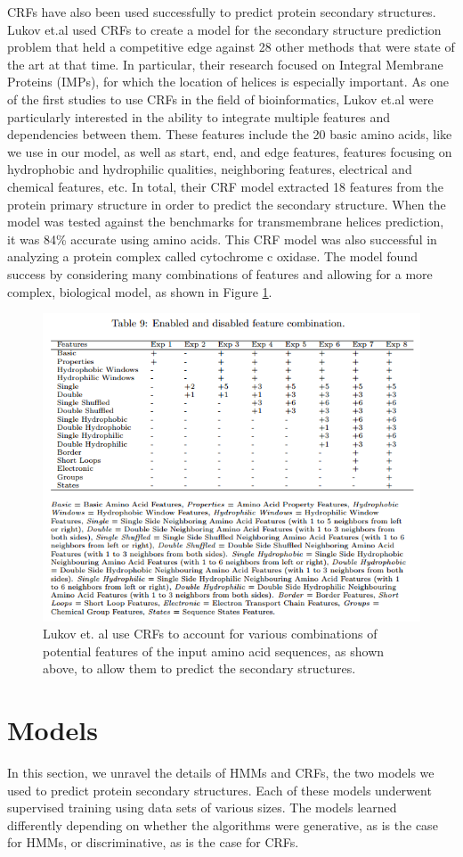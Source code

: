 \documentclass[11 pt, twocolumn]{article}
\begin{document}
CRFs have also been used successfully to predict protein secondary structures. Lukov et.al\cite{Lukov} used CRFs to create a model for the secondary structure prediction problem that held a competitive edge against 28 other methods that were state of the art at that time. In particular, their research focused on Integral Membrane Proteins (IMPs), for which the location of helices is especially important. As one of the first studies to use CRFs in the field of bioinformatics, Lukov et.al were particularly interested in the ability to integrate multiple features and dependencies between them. These features include the 20 basic amino acids, like we use in our model, as well as start, end, and edge features, features focusing on hydrophobic and hydrophilic qualities, neighboring features, electrical and chemical features, etc. In total, their CRF model extracted 18 features from the protein primary structure in order to predict the secondary structure. When the model was tested against the benchmarks for transmembrane helices prediction, it was 84\% accurate using amino acids. This CRF model was also successful in analyzing a protein complex called cytochrome c oxidase. The model found success by considering many combinations of features and allowing for a more complex, biological model, as shown in Figure \ref{fig:compCRFMod}.

\begin{figure}
\includegraphics[width = .5\textwidth]{ComplexCRFMod.png}
\caption{Lukov et. al \cite{Lukov} use CRFs to account for various combinations of potential features of the input amino acid sequences, as shown above, to allow them to predict the secondary structures.}
\label{fig:compCRFMod}
\end{figure}

\section{Models}

In this section, we unravel the details of HMMs and CRFs, the two models we used to predict protein secondary structures. Each of these models underwent supervised training using data sets of various sizes. The models learned differently depending on whether the algorithms were generative, as is the case for HMMs, or discriminative, as is the case for CRFs. 
\end{document}
